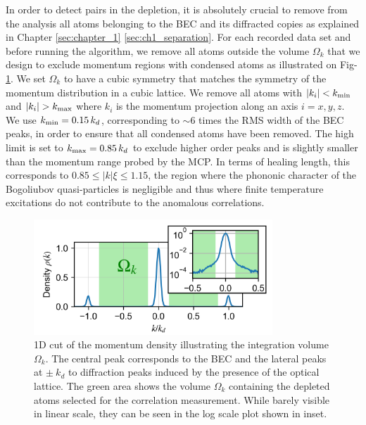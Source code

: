 In order to detect \kmk pairs in the depletion, it is absolutely crucial to remove from the analysis all atoms belonging to the BEC and its diffracted copies as explained in Chapter \ref{sec:chapter_1} \ref{sec:ch1_separation}. For each recorded data set and before running the algorithm, we remove all atoms outside the volume $\Omega_k$ that we design to exclude momentum regions with condensed atoms as illustrated on Fig-\ref{fig:omega_k}. We set $\Omega_k$ to have a cubic symmetry that matches the symmetry of the momentum distribution in a cubic lattice. We remove all atoms with $|k_i| < k_{\rm{min}}$ and $|k_i| > k_{\rm{max}}$ where $k_i$ is the momentum projection along an axis $i=x,y,z$. We use $k_{\rm{min}}=0.15 \, k_d$, corresponding to $\sim 6$ times the RMS width of the BEC peaks, in order to ensure that all condensed atoms have been removed. The high limit is set to $k_{\rm{max}}=0.85 \, k_d$ to exclude higher order peaks and is slightly smaller than the momentum range probed by the MCP. In terms of healing length, this corresponds to $0.85 \leq | k | \xi \leq 1.15$, \ie the region where the phononic character of the Bogoliubov quasi-particles is negligible and thus where finite temperature excitations do not contribute to the anomalous correlations. 

\begin{figure}
    \centering
    \includegraphics[width=0.8\textwidth]{Fig/Chapter4/densite.png}
    \caption[1D cut of the momentum density illustrating the integration volume $\Omega_k$]{1D cut of the momentum density illustrating the integration volume $\Omega_k$. The central peak corresponds to the BEC and the lateral peaks at $\pm \ k_d$ to diffraction peaks induced by the presence of the optical lattice. The green area shows the volume $\Omega_k$ containing the depleted atoms selected for the correlation measurement. While barely visible in linear scale, they can be seen in the log scale plot shown in inset.}
    \label{fig:omega_k}
\end{figure}

